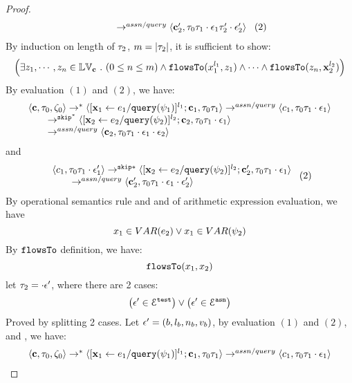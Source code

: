 \begin{proof}
\[\begin{array}{l}
  \qquad \rightarrow^{assn/query} 
  \langle {\boldsymbol{\mathbf{c}}}_2',  \mathtt{\tau}_0 \mathtt{\tau}_1 \cdot \mathtt{\epsilon}_1 \mathtt{\tau}_2' \cdot \mathtt{\epsilon}_2' \rangle 
\end{array} ~(2)
 \]
%
By induction on length of $\mathtt{\tau}_2$, $m = |\mathtt{\tau}_2|$, it is sufficient to show:
%
 \[
 \Big( \exists z_1, \cdots, z_n \in \mathbb{LV}_{{\boldsymbol{\mathbf{c}}}} ~.~ (0 \leq n \leq m )
 \land \mathtt{flowsTo}(x_1^{l_1}, z_1) \land \cdots \land \mathtt{flowsTo}(z_n, {\boldsymbol{\mathbf{x}}}_2^{l_2}) \Big)
  \]
 By evaluation $(1)$ and $(2)$, we have:
\[
  \begin{array}{l}   
\langle {\boldsymbol{\mathbf{c}}}, \mathtt{\tau}_0, \mathtt{\zeta}_0 \rangle \rightarrow^{*} 
\langle [\mathrel{ {\boldsymbol{\mathbf{x}}}_1 \leftarrow e_1 / {\tt query}(\psi_1) }]^{l_1} ; {\boldsymbol{\mathbf{c}}}_1, \mathtt{\tau}_0 \mathtt{\tau}_1 \rangle  \rightarrow^{assn/query}
 \langle c_1, \mathtt{\tau}_0 \mathtt{\tau}_1 \cdot \mathtt{\epsilon}_1 \rangle \\
  \qquad \rightarrow^{\mathtt{skip}^*} 
  \langle [\mathrel{ {\boldsymbol{\mathbf{x}}}_2 \leftarrow e_2 / {\tt query}(\psi_2) }]^{l_2};{\boldsymbol{\mathbf{c}}}_2, 
  \mathtt{\tau}_0 \mathtt{\tau}_1 \cdot \mathtt{\epsilon}_1 \rangle 
  \\
  \qquad \rightarrow^{assn/query} 
  \langle {\boldsymbol{\mathbf{c}}}_2,  \mathtt{\tau}_0 \mathtt{\tau}_1 \cdot \mathtt{\epsilon}_1 \cdot \mathtt{\epsilon}_2 \rangle 
\end{array}
 \]
 and 
  \[
  \begin{array}{l}   
  \langle c_1, \mathtt{\tau}_0 \mathtt{\tau}_1 \cdot \mathtt{\epsilon}_1' \rangle 
  \rightarrow^{\mathtt{skip}*} 
  \langle [\mathrel{ {\boldsymbol{\mathbf{x}}}_2 \leftarrow e_2 / {\tt query}(\psi_2) }]^{l_2} ; {\boldsymbol{\mathbf{c}}}_2', \mathtt{\tau}_0 \mathtt{\tau}_1 \cdot \mathtt{\epsilon}_1 \rangle 
  \\
  \qquad \rightarrow^{assn/query} 
  \langle {\boldsymbol{\mathbf{c}}}_2',  \mathtt{\tau}_0 \mathtt{\tau}_1 \cdot \mathtt{\epsilon}_1 \cdot \mathtt{\epsilon}_2' \rangle 
\end{array} ~(2)
 \]
%
By operational semantics rule  and  and  of arithmetic expression evaluation, we have 
\[
  x_1 \in VAR(e_2) \lor x_1 \in VAR(\psi_2)
\]
By $\mathtt{flowsTo}$ definition, we have:
\[
\mathtt{flowsTo}(x_1, x_2)
\]
%
 let $\mathtt{\tau}_2 = \cdot \mathtt{\epsilon}'$,  where there are 2 cases: 
 \[
 \big(\mathtt{\epsilon}' \in \mathcal{E}^{\mathtt{{test}}}\big) \lor \big(\mathtt{\epsilon}' \in \mathcal{E}^{\mathtt{{asn}}}\big)
 \]
 Proved by splitting 2 cases.
Let $\mathtt{\epsilon}' = (b, l_b, n_b, v_b)$, by evaluation $(1)$ and $(2)$, and , we have:
\[
  \begin{array}{l}   
\langle {\boldsymbol{\mathbf{c}}}, \mathtt{\tau}_0, \mathtt{\zeta}_0 \rangle \rightarrow^{*} 
\langle [\mathrel{ {\boldsymbol{\mathbf{x}}}_1 \leftarrow e_1 / {\tt query}(\psi_1) }]^{l_1} ; {\boldsymbol{\mathbf{c}}}_1, \mathtt{\tau}_0 \mathtt{\tau}_1 \rangle  \rightarrow^{assn/query}
 \langle c_1, \mathtt{\tau}_0 \mathtt{\tau}_1 \cdot \mathtt{\epsilon}_1 \rangle \\

\end{array}\]
\end{proof}
